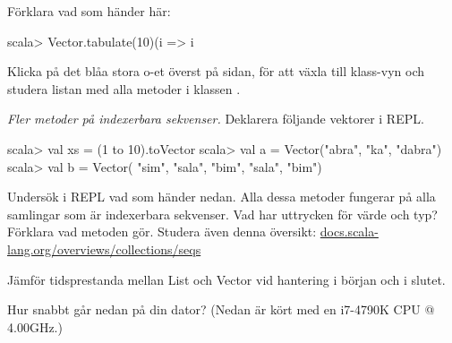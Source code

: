 \Subtask Förklara vad som händer här:
\begin{REPLnonum}
scala> Vector.tabulate(10)(i => i %
\end{REPLnonum}

\Subtask Klicka på det blåa stora o-et överst på sidan, för att växla till klass-vyn och studera listan med alla metoder  i klassen . 


\Task \emph{Fler metoder på indexerbara sekvenser.} Deklarera följande vektorer i REPL. 
\begin{REPL}
scala> val xs = (1 to 10).toVector
scala> val a = Vector("abra", "ka", "dabra")
scala> val b = Vector( "sim", "sala", "bim", "sala", "bim")
\end{REPL}
Undersök i REPL vad som händer nedan. Alla dessa metoder fungerar på alla samlingar som är indexerbara sekvenser. Vad har uttrycken för värde och typ? Förklara vad metoden gör. Studera även denna  översikt: \href{http://docs.scala-lang.org/overviews/collections/seqs}{docs.scala-lang.org/overviews/collections/seqs}

\Subtask {}  %

\Subtask {}  %

\Subtask {} %

\Subtask {} %

\Subtask {}  %

\Subtask {} %

\Subtask {}	%

\Subtask {} %

\Subtask {} %

\Subtask {} %



\Task Jämför tidsprestanda mellan List och Vector vid hantering i början och i slutet. 

\Subtask Hur snabbt går nedan på din dator? (Nedan är kört med en i7-4790K CPU @ 4.00GHz.) %


